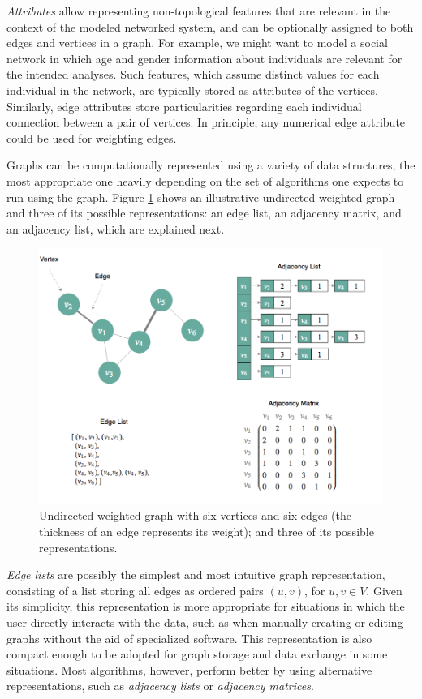 \textit{Attributes} allow representing non-topological features that are relevant in the context of the modeled networked system, and can be optionally assigned to both edges and vertices in a graph.
For example, we might want to model a social network in which age and gender information about individuals are relevant for the intended analyses.
Such features, which assume distinct values for each individual in the network, are typically stored as attributes of the vertices.
Similarly, edge attributes store particularities regarding each individual connection between a pair of vertices.
In principle, any numerical edge attribute could be used for weighting edges.

Graphs can be computationally represented using a variety of data structures, the most appropriate one heavily depending on the set of algorithms one expects to run using the graph.
Figure \ref{fig:graphs} shows an illustrative undirected weighted graph and three of its possible representations: an edge list, an adjacency matrix, and an adjacency list, which are explained next.

\begin{figure}[h!]
  	\centering
    \includegraphics[width=0.9\linewidth]{figures/network_models/graphs.png}
    \caption[Undirected weighted graph and three of its possible representations]{Undirected weighted graph with six vertices and six edges (the thickness of an edge represents its weight); and three of its possible representations.}
    \label{fig:graphs}
  \end{figure}
  

\textit{Edge lists} are possibly the simplest and most intuitive graph representation, consisting of a list storing all edges as ordered pairs $(u,v)$, for $u,v \in V$.
Given its simplicity, this representation is more appropriate for situations in which the user directly interacts with the data, such as when manually creating or editing graphs without the aid of specialized software. 
This representation is also compact enough to be adopted for graph storage and data exchange in some situations.
%
Most algorithms, however, perform better by using alternative representations, such as \textit{adjacency lists} or \textit{adjacency matrices}. 

